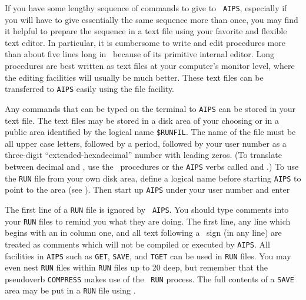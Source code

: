      If you have some lengthy sequence of commands to give to {\tt
AIPS}, especially if you will have to give essentially the same
sequence more than once, you may find it helpful to prepare the
sequence in a text file using your favorite and flexible text editor.
In particular, it is cumbersome to write and edit procedures more than
about five lines long in \AIPS\ because of its primitive internal
editor.  Long procedures are best written as text files at your
computer's monitor level, where the editing facilities will usually be
much better.  These text files can be transferred to {\tt AIPS} easily
using the {\tt {}} file facility.

      Any commands that can be typed on the terminal to {\tt AIPS} can
be stored in your text file.  The text files may be stored in a disk
area of your choosing or in a public area identified by the logical
name \hbox{{\tt \$RUNFIL}}.  The name of the file must be all upper
case letters, followed by a period, followed by your user number as a
three-digit ``extended-hexadecimal'' number with leading zeros.  (To
translate between decimal and , use the
\AIPS\ procedures or the {\tt AIPS} verbs called {\tt {}} and
\hbox{{\tt {}}}.)  To use the {\tt RUN} file from your own
disk area, define a logical name before starting {\tt AIPS} to point
to the area (see ).  Then start up {\tt AIPS} under your
user number and enter

     The first line of a {\tt RUN} file is ignored by \hbox{{\tt
AIPS}}.  You should type comments into your {\tt RUN} files to remind
you what they are doing.  The first line, any line which begins with
an {\tt *} in column one, and all text following a \dol\ sign (in any
line) are treated as comments which will not be compiled or executed
by \hbox{{\tt AIPS}}.  All facilities in {\tt AIPS} such as {\tt GET},
{\tt SAVE}, and {\tt TGET} can be used in {\tt RUN} files.  You
may even nest {\tt RUN} files within {\tt RUN} files up to 20 deep,
but remember that the pseudoverb {\tt COMPRESS} makes use of the {\tt
RUN} process.  The full contents of a {\tt SAVE} area may be put in a
{\tt RUN} file using {\tt {}}\@.


